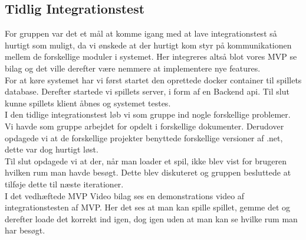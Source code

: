 \subsection{Tidlig Integrationstest}
For gruppen var det et mål at komme igang med at lave integrationstest så hurtigt som muligt, da vi ønskede at der hurtigt kom styr på kommunikationen mellem de forskellige moduler i systemet. Her integreres altså blot vores MVP se bilag \parencite[][Section]{} og det ville derefter være nemmere at implementere nye features.\\

\noindent For at køre systemet har vi først startet den oprettede docker container til spillets database. Derefter startede vi spillets server, i form af en Backend api. Til slut kunne spillets klient åbnes og systemet testes.\\

\noindent I den tidlige integrationstest løb vi som gruppe ind nogle forskellige problemer.\\
Vi havde som gruppe arbejdet for opdelt i forskellige dokumenter. 
Derudover opdagede vi at de forskellige projekter benyttede forskellige versioner af .net, dette var dog hurtigt løst.\\
Til slut opdagede vi at der, når man loader et spil, ikke blev vist for brugeren hvilken rum man havde besøgt. Dette blev diskuteret og gruppen besluttede at tilføje dette til næste iterationer.\\

\noindent I det vedhæftede MVP Video bilag ses en demonstrations video af integrationstesten af MVP. Her det ses at man kan spille spillet, gemme det og derefter loade det korrekt ind igen, dog igen uden at man kan se hvilke rum man har besøgt.
